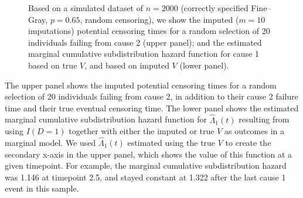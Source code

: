 \documentclass[
  letterpaper,
  paper=240mm:170mm,
  twoside=true,
  open=right,
  fontsize=10pt,
  pagesize=false,
  BCOR=15mm,
  DIV=14,
  headinclude=true,
  footinclude=false,
  headsepline=on]{scrbook}
\begin{document}
\begin{figure}


\caption{\label{fig-cens-appendix}Based on a simulated dataset of
\(n = 2000\) (correctly specified Fine--Gray, \(p = 0.65\), random
censoring), we show the imputed (\(m = 10\) imputations) potential
censoring times for a random selection of 20 individuals failing from
cause 2 (upper panel); and the estimated marginal cumulative
subdistribution hazard function for cause 1 based on true \(V\), and
based on imputed \(V\) (lower panel).}

\end{figure}%

The upper panel shows the imputed potential censoring times for a random
selection of 20 individuals failing from cause 2, in addition to their
cause 2 failure time and their true eventual censoring time. The lower
panel shows the estimated marginal cumulative subdistribution hazard
function for \(\hat{\Lambda}_1(t)\) resulting from using \(I(D = 1)\)
together with either the imputed or true \(V\) as outcomes in a marginal
model. We used \(\hat{\Lambda}_1(t)\) estimated using the true \(V\) to
create the secondary x-axis in the upper panel, which shows the value of
this function at a given timepoint. For example, the marginal cumulative
subdistribution hazard was 1.146 at timepoint 2.5, and stayed constant
at 1.322 after the last cause 1 event in this sample.
\end{document}
